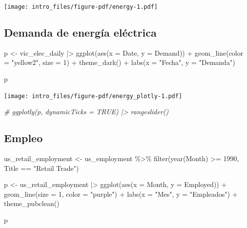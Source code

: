 \documentclass[
  letterpaper,
  DIV=11,
  numbers=noendperiod]{scrartcl}
\newenvironment{Shaded}{}{}
\newcommand{\AttributeTok}[1]{\textcolor[rgb]{0.65,0.15,0.64}{#1}}
\newcommand{\CommentTok}[1]{\textcolor[rgb]{0.63,0.63,0.65}{\textit{#1}}}
\newcommand{\DecValTok}[1]{\textcolor[rgb]{0.60,0.41,0.00}{#1}}
\newcommand{\FunctionTok}[1]{\textcolor[rgb]{0.25,0.47,0.95}{#1}}
\newcommand{\NormalTok}[1]{\textcolor[rgb]{0.22,0.23,0.26}{#1}}
\newcommand{\OtherTok}[1]{\textcolor[rgb]{0.15,0.68,0.38}{#1}}
\newcommand{\SpecialCharTok}[1]{\textcolor[rgb]{0.00,0.52,0.74}{#1}}
\newcommand{\StringTok}[1]{\textcolor[rgb]{0.31,0.63,0.31}{#1}}
\begin{document}
\texttt{[image: intro\_files/figure-pdf/energy-1.pdf]}

\subsection{Demanda de energía
eléctrica}\label{demanda-de-energuxeda-eluxe9ctrica}

\begin{Shaded}
\begin{Highlighting}[]
\NormalTok{p }\OtherTok{\textless{}{-}}\NormalTok{ vic\_elec\_daily }\SpecialCharTok{|\textgreater{}} 
  \FunctionTok{ggplot}\NormalTok{(}\FunctionTok{aes}\NormalTok{(}\AttributeTok{x =}\NormalTok{ Date, }\AttributeTok{y =}\NormalTok{ Demand)) }\SpecialCharTok{+}
  \FunctionTok{geom\_line}\NormalTok{(}\AttributeTok{color =} \StringTok{"yellow2"}\NormalTok{, }\AttributeTok{size =} \DecValTok{1}\NormalTok{) }\SpecialCharTok{+}
  \FunctionTok{theme\_dark}\NormalTok{() }\SpecialCharTok{+}
  \FunctionTok{labs}\NormalTok{(}\AttributeTok{x =} \StringTok{"Fecha"}\NormalTok{, }\AttributeTok{y =} \StringTok{"Demanda"}\NormalTok{)}

\NormalTok{p}
\end{Highlighting}
\end{Shaded}

\texttt{[image: intro\_files/figure-pdf/energy\_plotly-1.pdf]}

\begin{Shaded}
\begin{Highlighting}[]
\CommentTok{\# ggplotly(p, dynamicTicks = TRUE) |\textgreater{} rangeslider()}
\end{Highlighting}
\end{Shaded}

\subsection{Empleo}\label{empleo}

\begin{Shaded}
\begin{Highlighting}[]
\NormalTok{us\_retail\_employment }\OtherTok{\textless{}{-}}\NormalTok{ us\_employment }\SpecialCharTok{\%\textgreater{}\%}
  \FunctionTok{filter}\NormalTok{(}\FunctionTok{year}\NormalTok{(Month) }\SpecialCharTok{\textgreater{}=} \DecValTok{1990}\NormalTok{, Title }\SpecialCharTok{==} \StringTok{"Retail Trade"}\NormalTok{)}

\NormalTok{p }\OtherTok{\textless{}{-}}\NormalTok{ us\_retail\_employment }\SpecialCharTok{|\textgreater{}} 
  \FunctionTok{ggplot}\NormalTok{(}\FunctionTok{aes}\NormalTok{(}\AttributeTok{x =}\NormalTok{ Month, }\AttributeTok{y =}\NormalTok{ Employed)) }\SpecialCharTok{+}
  \FunctionTok{geom\_line}\NormalTok{(}\AttributeTok{size =} \DecValTok{1}\NormalTok{, }\AttributeTok{color =} \StringTok{"purple"}\NormalTok{) }\SpecialCharTok{+}
  \FunctionTok{labs}\NormalTok{(}\AttributeTok{x =} \StringTok{"Mes"}\NormalTok{, }\AttributeTok{y =} \StringTok{"Empleados"}\NormalTok{) }\SpecialCharTok{+} 
  \FunctionTok{theme\_pubclean}\NormalTok{()}

\NormalTok{p}
\end{Highlighting}
\end{Shaded}
\end{document}
